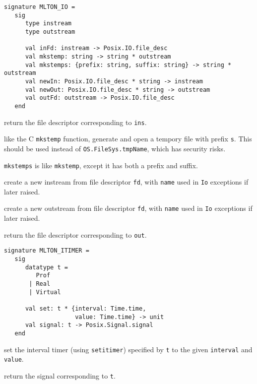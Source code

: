 
\begin{verbatim}
signature MLTON_IO =
   sig
      type instream
      type outstream

      val inFd: instream -> Posix.IO.file_desc
      val mkstemp: string -> string * outstream
      val mkstemps: {prefix: string, suffix: string} -> string * outstream
      val newIn: Posix.IO.file_desc * string -> instream
      val newOut: Posix.IO.file_desc * string -> outstream
      val outFd: outstream -> Posix.IO.file_desc
   end
\end{verbatim}

\begin{description}

 return the file descriptor corresponding to {\tt ins}.

like the C {\tt mkstemp} function, generate and open a tempory file with prefix
{\tt s}.  This should be used instead of {\tt OS.FileSys.tmpName}, which has
security risks.

{\tt mkstemps} is like {\tt mkstemp}, except it has both a prefix and suffix.

 create a new instream from file descriptor
{\tt fd}, with {\tt name} used in {\tt Io} exceptions if later
raised.

 create a new outstream from file descriptor
{\tt  fd}, with {\tt name} used in {\tt Io} exceptions if later
raised.

 return the file descriptor corresponding to
{\tt out}.
\end{description}


\begin{verbatim}
signature MLTON_ITIMER =
   sig
      datatype t =
         Prof
       | Real
       | Virtual

      val set: t * {interval: Time.time,
                    value: Time.time} -> unit
      val signal: t -> Posix.Signal.signal
   end
\end{verbatim}

\begin{description}
set the interval timer (using {\tt setitimer}) specified by {\tt t} to
the given {\tt interval} and {\tt value}.

return the signal corresponding to {\tt t}.
\end{description}

